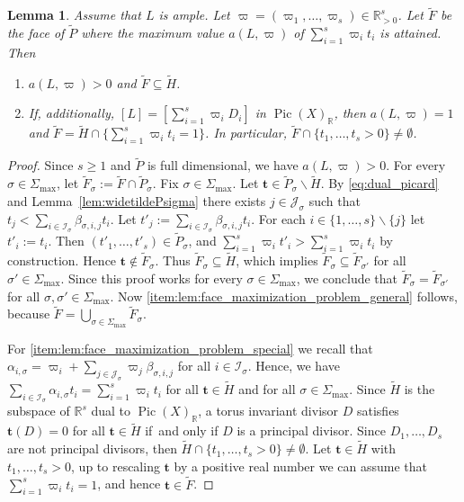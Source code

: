 \documentclass[JEP,XML,SOM,Unicode,published]{cedram}
\newenvironment{enumeratei}
{\bgroup\def\theenumi{\roman{enumi}}\def\theenumii{\arabic{enumii}}\begin{enumerate}}
{\end{enumerate}\egroup}
\newcommand{\bft}{\boldsymbol{t}}
\newcommand\RR{\mathbb{R}}
\newcommand{\ii}[1]{\mathcal{J}_{#1}}
\newcommand{\ic}[1]{\mathcal{I}_{#1}}
\DeclareMathOperator{\pic}{Pic}
\newtheorem{lemma}[theorem]{Lemma}
\theoremstyle{definition}
\numberwithin{theorem}{section}
\begin{document}
\begin{lemma}
\label{lem:face_maximization_problem}
Assume that $L$ is ample. Let $\varpi=(\varpi_1,\dots,\varpi_s)\in\RR^s_{>0}$.
Let $\widetilde F$ be the face of $\widetilde P$ where the maximum value
$a(L,\varpi)$ of $\sum_{i=1}^s\varpi_i t_i$ is attained.
Then
\begin{enumeratei}
\item
\label{item:lem:face_maximization_problem_general}
$a(L,\varpi)>0$ and $\widetilde F\subseteq \widetilde H$.
\item
\label{item:lem:face_maximization_problem_special}
If, additionally, $[L]=[\sum_{i=1}^s\varpi_i D_i]$ in $\pic(X)_{\RR}$, then $a(L,\varpi)=1$
and $\widetilde F=\widetilde H \cap \{\sum_{i=1}^s\varpi_i t_i=1\}$.
In particular, $\widetilde F\cap \{t_1,\dots,t_s>0\}\neq\emptyset$.
\end{enumeratei}
\end{lemma}
\begin{proof}
Since $s\geq1$ and $\widetilde P$ is full dimensional, we have $a(L,\varpi)>0$.
For every $\sigma\in\Sigma_{\max}$, let
$\widetilde F_\sigma:= \widetilde F\cap \widetilde P_\sigma$.
Fix $\sigma\in\Sigma_{\max}$.
Let $\bft\in \widetilde P_\sigma \smallsetminus \widetilde H$.
By \eqref{eq:dual_picard} and Lemma~\ref{lem:widetildePsigma}
there exists $j\in\ii{\sigma}$ such that
$t_{j}<\sum_{i\in\ic{\sigma}}\beta_{\sigma,i,j} t_i$.
Let $t'_{j}:=\sum_{i\in\ic{\sigma}}\beta_{\sigma,i,j} t_i$.
For each $i\in\{1,\dots,s\}\smallsetminus\{j\}$ let $t'_i:=t_i$.
Then $(t'_{1},\dots,t'_{s}) \in \widetilde P_\sigma$, and
$\sum_{i=1}^s\varpi_i t'_i
> \sum_{i=1}^s\varpi_i t_i $ by construction.
Hence $\bft\notin \widetilde F_\sigma$.
Thus $\widetilde F_\sigma \subseteq \widetilde H$, which implies
$\widetilde F_{\sigma} \subseteq \widetilde F_{\sigma'}$ for all $\sigma'\in\Sigma_{\max}$.
Since this proof works for every $\sigma \in \Sigma_{\max}$, we conclude that
$\widetilde F_{\sigma} = \widetilde F_{\sigma'}$ for all $\sigma, \sigma'\in\Sigma_{\max}$.
Now \eqref{item:lem:face_maximization_problem_general} follows, because
$\widetilde F=\bigcup_{\sigma\in\Sigma_{\max}}\widetilde F_\sigma$.

For \eqref{item:lem:face_maximization_problem_special} we recall that
$\alpha_{i,\sigma}=\varpi_i+\sum_{j\in\ii{\sigma}}\varpi_j\beta_{\sigma,i,j}$
for all $i\in\ic{\sigma}$. Hence, we have
$\sum_{i\in\ic{\sigma}}\alpha_{i,\sigma}t_i=\sum_{i=1}^s\varpi_i t_i$
for all $\bft\in \widetilde H$ and for all $\sigma\in\Sigma_{\max}$.
Since $\widetilde H$ is the subspace of $\RR^s$ dual to $\pic(X)_{\RR}$,
a torus invariant divisor $D$ satisfies $\bft(D)=0$ for all $\bft\in\widetilde H$
if~and only if $D$ is a principal divisor. Since $D_1,\dots, D_s$ are not principal divisors, then
$\widetilde H \cap \{t_1,\dots,t_s>0\}\neq\emptyset$.
Let $\bft \in \widetilde H$ with $t_1,\dots,t_s>0$,
up to rescaling $\bft$ by a positive real number we can assume that
$\sum_{i=1}^s\varpi_i t_i=1$, and hence $\bft\in\widetilde F$.
\end{proof}
\end{document}
